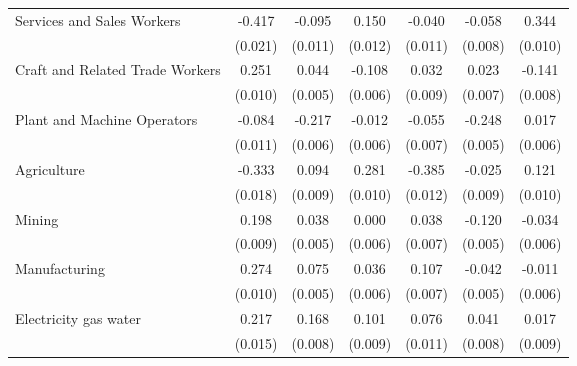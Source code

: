 \begin{table}[htbp]
\begin{tabular}{l*{6}{c}}
Services and Sales Workers&      -0.417\sym{***}&      -0.095\sym{***}&       0.150\sym{***}&      -0.040\sym{***}&      -0.058\sym{***}&       0.344\sym{***}\\
                    &     (0.021)         &     (0.011)         &     (0.012)         &     (0.011)         &     (0.008)         &     (0.010)         \\
Craft and Related Trade Workers&       0.251\sym{***}&       0.044\sym{***}&      -0.108\sym{***}&       0.032\sym{***}&       0.023\sym{***}&      -0.141\sym{***}\\
                    &     (0.010)         &     (0.005)         &     (0.006)         &     (0.009)         &     (0.007)         &     (0.008)         \\
Plant and Machine Operators&      -0.084\sym{***}&      -0.217\sym{***}&      -0.012         &      -0.055\sym{***}&      -0.248\sym{***}&       0.017\sym{**} \\
                    &     (0.011)         &     (0.006)         &     (0.006)         &     (0.007)         &     (0.005)         &     (0.006)         \\
Agriculture         &      -0.333\sym{***}&       0.094\sym{***}&       0.281\sym{***}&      -0.385\sym{***}&      -0.025\sym{**} &       0.121\sym{***}\\
                    &     (0.018)         &     (0.009)         &     (0.010)         &     (0.012)         &     (0.009)         &     (0.010)         \\
Mining              &       0.198\sym{***}&       0.038\sym{***}&       0.000         &       0.038\sym{***}&      -0.120\sym{***}&      -0.034\sym{***}\\
                    &     (0.009)         &     (0.005)         &     (0.006)         &     (0.007)         &     (0.005)         &     (0.006)         \\
Manufacturing       &       0.274\sym{***}&       0.075\sym{***}&       0.036\sym{***}&       0.107\sym{***}&      -0.042\sym{***}&      -0.011         \\
                    &     (0.010)         &     (0.005)         &     (0.006)         &     (0.007)         &     (0.005)         &     (0.006)         \\
Electricity gas water&       0.217\sym{***}&       0.168\sym{***}&       0.101\sym{***}&       0.076\sym{***}&       0.041\sym{***}&       0.017         \\
                    &     (0.015)         &     (0.008)         &     (0.009)         &     (0.011)         &     (0.008)         &     (0.009)         \\

\end{tabular}
\end{table}
